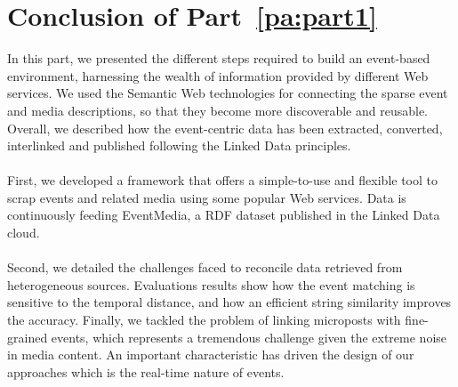 \chapter*{Conclusion of Part~\ref{pa:part1}}

In this part, we presented the different steps required to build an event-based environment, harnessing the wealth of information provided by different Web services. We used the Semantic Web technologies for connecting the sparse event and media descriptions, so that they become more discoverable and reusable. Overall, we described how the event-centric data has been extracted, converted, interlinked and published following the Linked Data principles.
\\
\\
First, we developed a framework that offers a simple-to-use and flexible tool to scrap events and related media using some popular Web services. Data is continuously feeding EventMedia, a RDF dataset published in the Linked Data cloud. 
\\
\\
Second, we detailed the challenges faced to reconcile data retrieved from heterogeneous sources. Evaluations results show how the event matching is sensitive to the temporal distance, and how an efficient string similarity improves the accuracy. Finally, we tackled the problem of linking microposts with fine-grained events, which represents a tremendous challenge given the extreme noise in media content. An important characteristic has driven the design of our approaches which is the real-time nature of events.


